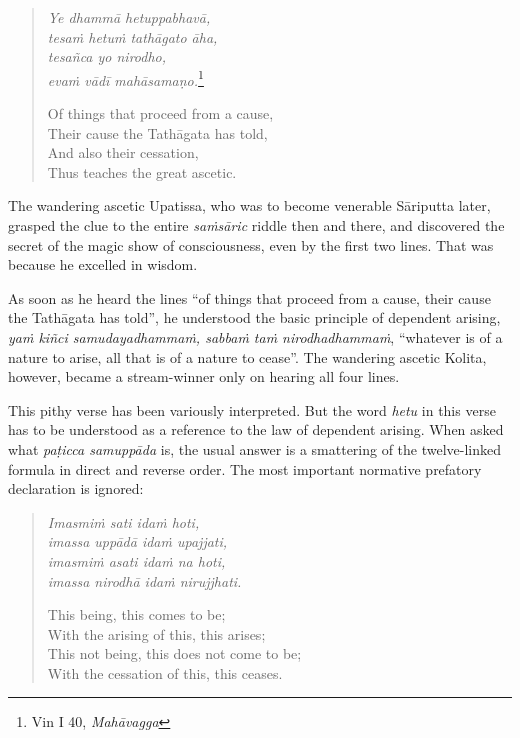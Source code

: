 \begin{quote}
\emph{Ye dhammā hetuppabhavā,}\\
\emph{tesaṁ hetuṁ tathāgato āha,}\\
\emph{tesañca yo nirodho,}\\
\emph{evaṁ vādī mahāsamaṇo.}\footnote{Vin I 40, \emph{Mahāvagga}}

Of things that proceed from a cause,\\
Their cause the Tathāgata has told,\\
And also their cessation,\\
Thus teaches the great ascetic.
\end{quote}

The wandering ascetic Upatissa, who was to become venerable Sāriputta later, grasped the clue to the entire \emph{saṁsāric} riddle then and there, and discovered the secret of the magic show of consciousness, even by the first two lines. That was because he excelled in wisdom.

As soon as he heard the lines ``of things that proceed from a cause, their cause the Tathāgata has told'', he understood the basic principle of dependent arising, \emph{yaṁ kiñci samudayadhammaṁ, sabbaṁ taṁ nirodhadhammaṁ}, ``whatever is of a nature to arise, all that is of a nature to cease''. The wandering ascetic Kolita, however, became a stream-winner only on hearing all four lines.

This pithy verse has been variously interpreted. But the word \emph{hetu} in this verse has to be understood as a reference to the law of dependent arising. When asked what \emph{paṭicca samuppāda} is, the usual answer is a smattering of the twelve-linked formula in direct and reverse order. The most important normative prefatory declaration is ignored:

\begin{quote}
\emph{Imasmiṁ sati idaṁ hoti,}\\
\emph{imassa uppādā idaṁ upajjati,}\\
\emph{imasmiṁ asati idaṁ na hoti,}\\
\emph{imassa nirodhā idaṁ nirujjhati.}

This being, this comes to be;\\
With the arising of this, this arises;\\
This not being, this does not come to be;\\
With the cessation of this, this ceases.
\end{quote}

